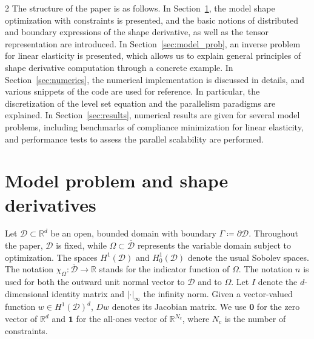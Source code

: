 \documentclass[a4paper, oneside]{article}
\newcommand{\hold}{\mathcal{D}}
\newcommand{\Om}{\Omega}
\begin{document}
\begin{multicols}{2}
The structure of the paper is as follows. 
In Section~\ref{sec:shape-opt}, the model shape optimization with constraints is presented, and the basic notions of distributed and boundary expressions of the shape derivative, as well as the  tensor representation
are introduced. 
In Section~\ref{sec:model_prob}, an inverse problem for linear elasticity is presented, which allows us to explain general principles of shape derivative computation through a concrete example.
In Section~\ref{sec:numerics}, the numerical implementation is discussed in details, and various snippets of the code are used for reference. In particular, the discretization of the level set equation and the parallelism paradigms are explained.
In Section~\ref{sec:results}, numerical results are given for several model problems, including benchmarks of compliance minimization for linear elasticity, and performance tests to assess the parallel scalability are performed.

\section{Model problem and shape derivatives}\label{sec:shape-opt}

Let $\mathcal{D} \subset \mathds{R}^d$ be an open, bounded domain with boundary
$\Gamma \coloneqq \partial \mathcal{D}$.
Throughout the paper, $\mathcal{D}$ is fixed, while $\Om \subset \overline{\mathcal{D}}$ represents the variable domain subject to optimization.
The spaces $H^1(\mathcal{D})$ and $H^1_0(\mathcal{D})$ denote the usual Sobolev spaces.
The notation $\chi_{\Omega}:\overline{\mathcal{D}} \rightarrow \mathds{R}$ stands for
the indicator function of $\Omega$.
The notation $n$ is used for both the outward unit normal vector to $\hold$ and to $\Om$. 
Let $I$ denote the $d$-dimensional identity matrix and $\left|\cdot\right|_{\infty}$ the infinity norm.
Given a vector-valued function $w \in H^1(\mathcal{D})^d$,
$Dw$ denotes its Jacobian matrix.
We use $\boldsymbol{0}$ for the zero vector of $\mathds{R}^d$ and 
$\boldsymbol{1}$ for the all-ones vector of $\mathds{R}^{N_c}$,
where $N_c$ is the number of constraints.


\end{multicols}
\end{document}

